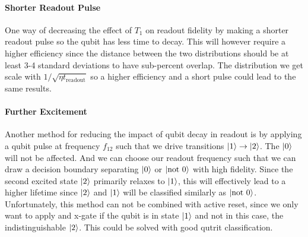\paragraph{Shorter Readout Pulse} One way of decreasing the effect of $T_1$ on readout fidelity by making a shorter readout pulse so the qubit has less time to decay. This will however require a higher efficiency since the distance between the two distributions should be at least 3-4 standard deviations to have sub-percent overlap. The distribution we get scale with $1 / \sqrt{\eta t_{\text{readout}}}$ so a higher efficiency and a short pulse could lead to the same results.

\paragraph{Further Excitement} Another method for reducing the impact of qubit decay in readout is by applying a qubit pulse at frequency $f_{12}$ such that we drive transitions $\ket{1}\to\ket{2}$. The $\ket{0}$ will not be affected. And we can choose our readout frequency such that we can draw a decision boundary separating $\ket{0}$ or $\ket{\text{not }0}$ with high fidelity. Since the second excited state $\ket{2}$ primarily relaxes to $\ket{1}$, this will effectively lead to a higher lifetime since $\ket{2}$ and $\ket{1}$ will be classified similarly as $\ket{\text{not } 0}$. Unfortunately, this method can not be combined with active reset, since we only want to apply and x-gate if the qubit is in state $\ket{1}$ and not in this case, the indistinguishable $\ket{2}$. This could be solved with good qutrit classification.



